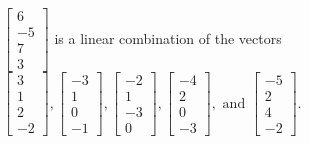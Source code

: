 \begin{exercise}
\begin{exerciseStatement}
  \end{exerciseStatement}
  \begin{exerciseAnswer}
   \(\left[\begin{array}{c}
6 \\
-5 \\
7 \\
3
\end{array}\right]\) 
  	 is  
	a linear combination of the vectors \(\left[\begin{array}{c}
3 \\
1 \\
2 \\
-2
\end{array}\right] , \left[\begin{array}{c}
-3 \\
1 \\
0 \\
-1
\end{array}\right] , \left[\begin{array}{c}
-2 \\
1 \\
-3 \\
0
\end{array}\right] , \left[\begin{array}{c}
-4 \\
2 \\
0 \\
-3
\end{array}\right] , \text{ and } \left[\begin{array}{c}
-5 \\
2 \\
4 \\
-2
\end{array}\right]\).

	
  


  \end{exerciseAnswer}
\end{exercise}